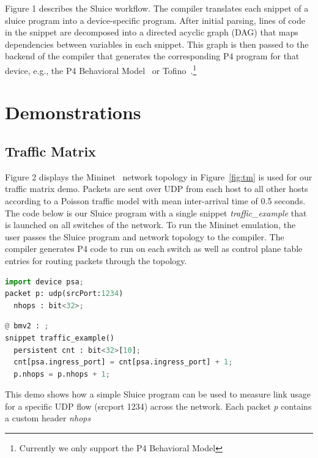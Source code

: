 Figure 1 describes the Sluice workflow. The compiler translates each snippet of
a sluice program into a device-specific program. After initial parsing, lines
of code in the snippet are decomposed into a directed acyclic graph (DAG) that
maps dependencies between variables in each snippet. This graph is then passed
to the backend of the compiler that generates the corresponding P4 program for
that device, e.g., the P4 Behavioral Model~\cite{bmv2} or Tofino~\cite{tofino}.\footnote{Currently we only support
the P4 Behavioral Model} 
\vspace{-0.12in}
\section{Demonstrations}
\vspace{-0.05in}
\subsection{Traffic Matrix}
\vspace{-0.03in}
Figure 2 displays the Mininet~\cite{mininet} network topology in Figure~\ref{fig:tm} is used for our traffic matrix demo.
Packets are sent over UDP from each host to all other hosts according to a
Poisson traffic model with mean inter-arrival time of 0.5 seconds. The code
below is our Sluice program with a single snippet \textit{traffic\_example}
that is launched on all switches of the network. To run the Mininet emulation, the
user passes the Sluice program and network topology to the compiler. The
compiler generates P4 code to run on each switch as well as control plane table entries for routing packets through the topology.
\vspace{-0.05in}
\begin{lstlisting}[language=Python, basicstyle=\scriptsize]
import device psa;
packet p: udp(srcPort:1234)
  nhops : bit<32>;
\end{lstlisting}
\vspace{-0.05in}
\begin{lstlisting}[language=Python, basicstyle=\scriptsize]
@ bmv2 : ;
snippet traffic_example()
  persistent cnt : bit<32>[10];
  cnt[psa.ingress_port] = cnt[psa.ingress_port] + 1;
  p.nhops = p.nhops + 1;
\end{lstlisting}
\vspace{-0.05in}
This demo shows how a simple Sluice program can be used to measure link usage for a specific UDP flow (srcport 1234) across the network. Each packet \textit{p} contains a custom header \textit{nhops}
